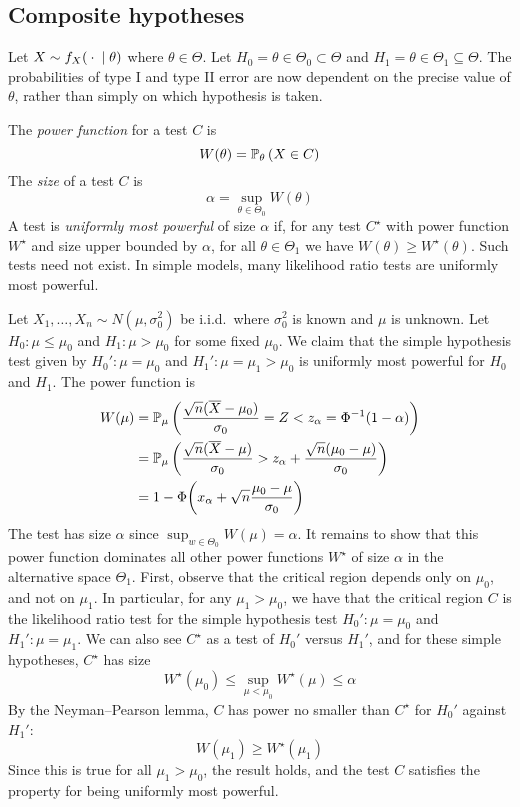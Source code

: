 \subsection{Composite hypotheses}
Let \( X \sim f_X({}\cdot{} \mid \theta) \) where \( \theta \in \Theta \).
Let \( H_0 = \theta \in \Theta_0 \subset \Theta \) and \( H_1 = \theta \in \Theta_1 \subseteq \Theta \).
The probabilities of type I and type II error are now dependent on the precise value of \( \theta \), rather than simply on which hypothesis is taken.
\begin{definition}
	The \textit{power function} for a test \( C \) is
	\[
		W(\theta) = \mathbb{P}_{\theta}\left({X \in C}\right)
	\]
	The \textit{size} of a test \( C \) is
	\[
		\alpha = \sup_{\theta \in \Theta_0} W(\theta)
	\]
	A test is \textit{uniformly most powerful} of size \( \alpha \) if, for any test \( C^\star \) with power function \( W^\star \) and size upper bounded by \( \alpha \), for all \( \theta \in \Theta_1 \) we have \( W(\theta) \geq W^\star(\theta) \).
	Such tests need not exist.
	In simple models, many likelihood ratio tests are uniformly most powerful.
\end{definition}
\begin{example}
	Let \( X_1, \dots, X_n \sim N(\mu, \sigma_0^2) \) be i.i.d.\ where \( \sigma_0^2 \) is known and \( \mu \) is unknown.
	Let \( H_0 \colon \mu \leq \mu_0 \) and \( H_1 \colon \mu > \mu_0 \) for some fixed \( \mu_0 \).
	We claim that the simple hypothesis test given by \( H_0' \colon \mu = \mu_0 \) and \( H_1' \colon \mu = \mu_1 > \mu_0 \) is uniformly most powerful for \( H_0 \) and \( H_1 \).
	The power function is
	\begin{align*}
		W(\mu) & = \mathbb{P}_{\mu}\left({\frac{\sqrt{n}(\overline X-\mu_0)}{\sigma_0} = Z < z_\alpha = \Phi^{-1}(1-\alpha)}\right)                \\
		       & = \mathbb{P}_{\mu}\left({\frac{\sqrt{n}(\overline X - \mu)}{\sigma_0} > z_\alpha + \frac{\sqrt{n}(\mu_0 - \mu)}{\sigma_0}}\right) \\
		       & = 1 - \Phi\qty(x_\alpha + \sqrt{n} \frac{\mu_0 - \mu}{\sigma_0})
	\end{align*}
	The test has size \( \alpha \) since \( \sup_{w \in \Theta_0} W(\mu) = \alpha \).
	It remains to show that this power function dominates all other power functions \( W^\star \) of size \( \alpha \) in the alternative space \( \Theta_1 \).
	First, observe that the critical region depends only on \( \mu_0 \), and not on \( \mu_1 \).
	In particular, for any \( \mu_1 > \mu_0 \), we have that the critical region \( C \) is the likelihood ratio test for the simple hypothesis test \( H_0' \colon \mu = \mu_0 \) and \( H_1' \colon \mu = \mu_1 \).
	We can also see \( C^\star \) as a test of \( H_0' \) versus \( H_1' \), and for these simple hypotheses, \( C^\star \) has size
	\[
		W^\star(\mu_0) \leq \sup_{\mu < \mu_0} W^\star(\mu) \leq \alpha
	\]
	By the Neyman--Pearson lemma, \( C \) has power no smaller than \( C^\star \) for \( H_0' \) against \( H_1' \):
	\[
		W(\mu_1) \geq W^\star(\mu_1)
	\]
	Since this is true for all \( \mu_1 > \mu_0 \), the result holds, and the test \( C \) satisfies the property for being uniformly most powerful.
\end{example}

